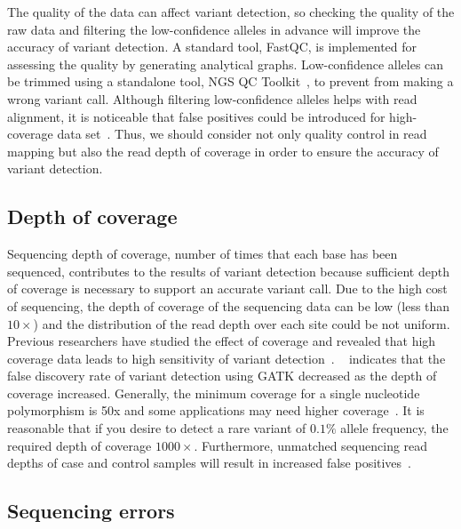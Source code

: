 \documentclass[a4,center,fleqn]{NAR}
\begin{document}
The quality of the data can affect variant detection, so checking the quality of the raw data and filtering the low-confidence alleles in advance will improve the accuracy of variant detection.
A standard tool, FastQC, is implemented for assessing the quality by generating analytical graphs.
Low-confidence alleles can be trimmed using a standalone tool, NGS QC Toolkit~\citep{patel2012ngs}, to prevent from making a wrong variant call.
Although filtering low-confidence alleles helps with read alignment, it is noticeable that false positives could be introduced for high-coverage data set~\citep{liu2012steps}.
Thus, we should consider not only quality control in read mapping but also the read depth of coverage in order to ensure the accuracy of variant detection.

\subsection{Depth of coverage}

Sequencing depth of coverage, number of times that each base has been sequenced, contributes to the results of variant detection because sufficient depth of coverage is necessary to support an accurate variant call.
Due to the high cost of sequencing, the depth of coverage of the sequencing data can be low (less than $10\times$) and the distribution of the read depth over each site could be not uniform.
Previous researchers have studied the effect of coverage and revealed that high coverage data leads to high sensitivity of variant detection~\citep{neuman2013analysis, krawitz2010microindel}.
~\citep{liu2013variant} indicates that the false discovery rate of variant detection using GATK decreased as the depth of coverage increased.
Generally, the minimum coverage for a single nucleotide polymorphism is 50x and some applications may need higher coverage~\citep{Schlotterer2014}.
It is reasonable that if you desire to detect a rare variant of $0.1 \%$ allele frequency, the required depth of coverage $1000\times$.
Furthermore, unmatched sequencing read depths of case and control samples will result in increased false positives~\citep{garner2011confounded}.

\subsection{Sequencing errors}
\end{document}
